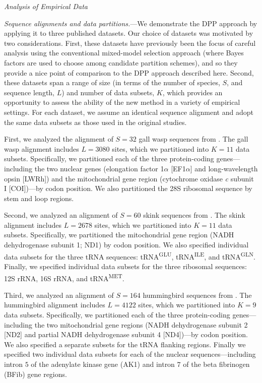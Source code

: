 \documentclass[11pt]{article}
\begin{document}
\bigskip
\begin{center}
{\it Analysis of Empirical Data}
\end{center}
{\it Sequence alignments and data partitions.}---We demonstrate the DPP approach by applying it to three published datasets.
Our choice of datasets was motivated by two considerations.
First, these datasets have previously been the focus of careful analysis using the conventional mixed-model selection approach (where Bayes factors are used to choose among candidate partition schemes), and so they provide a nice point of comparison to the DPP approach described here.
Second, these datasets span a range of size (in terms of the number of species, $S$, and sequence length, $L$) and number of data subsets, $K$, which provides an opportunity to assess the ability of the new method in a variety of empirical settings.
For each dataset, we assume an identical sequence alignment and adopt the same data subsets as those used in the original studies.

First, we analyzed the alignment of $S = 32$ gall wasp sequences from \citet{nylander04}.  
The gall wasp alignment includes $L = 3080$ sites, which we partitioned into $K = 11$ data subsets.
Specifically, we partitioned each of the three protein-coding genes---including the two nuclear genes (elongation factor 1$\alpha$ [EF1$\alpha$] and long-wavelength opsin [LWRh]) and the mitochondrial gene region (cytochrome oxidase {\it c } subunit I [COI])---by codon position. 
We also partitioned the 28S ribosomal sequence by stem and loop regions.  

Second, we analyzed an alignment of $S = 60$ skink sequences from \citet{brandley05}.  
The skink alignment includes $L = 2678$ sites, which we partitioned into $K = 11$ data subsets.
Specifically, we partitioned the mitochondrial gene region (NADH dehydrogenase subunit 1; ND1) by codon position.
We also specified individual data subsets for the three tRNA sequences: tRNA\textsuperscript{GLU}, tRNA\textsuperscript{ILE}, and tRNA\textsuperscript{GLN}.
Finally, we specified individual data subsets for the three ribosomal sequences: 12S rRNA, 16S rRNA, and tRNA\textsuperscript{MET}.  

Third, we analyzed an alignment of $S = 164$ hummingbird sequences from \citet{mcguire07}.  
The hummingbird alignment includes $L = 4122$ sites, which we partitioned into $K = 9$ data subsets.
Specifically, we partitioned each of the three protein-coding genes---including the two mitochondrial gene regions (NADH dehydrogenase subunit 2 [ND2] and partial NADH dehydrogenase subunit 4 [ND4])---by codon position.
We also specified a separate subsets for the tRNA flanking regions.
Finally we specified two individual data subsets for each of the nuclear sequences---including intron $5$ of the adenylate kinase gene (AK1) and intron $7$ of the beta fibrinogen (BFib) gene regions.  
\end{document}
